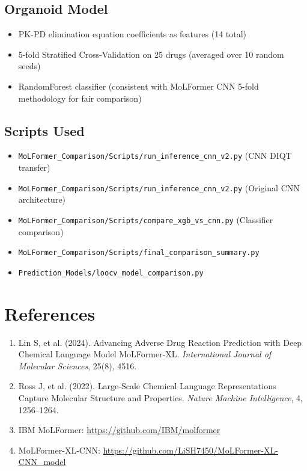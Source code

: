 \documentclass[11pt]{article}
\begin{document}
\subsection*{Organoid Model}
\begin{itemize}
    \item PK-PD elimination equation coefficients as features (14 total)
    \item 5-fold Stratified Cross-Validation on 25 drugs (averaged over 10 random seeds)
    \item RandomForest classifier (consistent with MoLFormer CNN 5-fold methodology for fair comparison)
\end{itemize}

\subsection*{Scripts Used}
\begin{itemize}
    \item \texttt{MoLFormer\_Comparison/Scripts/run\_inference\_cnn\_v2.py} (CNN DIQT transfer)
    \item \texttt{MoLFormer\_Comparison/Scripts/run\_inference\_cnn\_v2.py} (Original CNN architecture)
    \item \texttt{MoLFormer\_Comparison/Scripts/compare\_xgb\_vs\_cnn.py} (Classifier comparison)
    \item \texttt{MoLFormer\_Comparison/Scripts/final\_comparison\_summary.py}
    \item \texttt{Prediction\_Models/loocv\_model\_comparison.py}
\end{itemize}


\section*{References}

\begin{enumerate}
    \item Lin S, et al. (2024). Advancing Adverse Drug Reaction Prediction with Deep Chemical Language Model MoLFormer-XL. \textit{International Journal of Molecular Sciences}, 25(8), 4516.

    \item Ross J, et al. (2022). Large-Scale Chemical Language Representations Capture Molecular Structure and Properties. \textit{Nature Machine Intelligence}, 4, 1256--1264.

    \item IBM MoLFormer: \url{https://github.com/IBM/molformer}

    \item MoLFormer-XL-CNN: \url{https://github.com/LiSH7450/MoLFormer-XL-CNN_model}
\end{enumerate}
\end{document}
